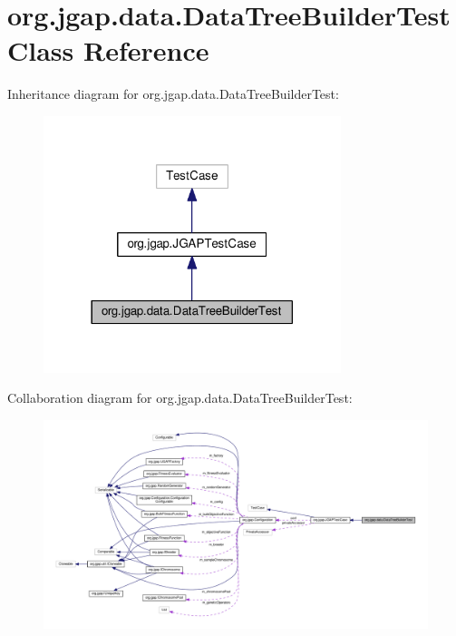 \hypertarget{classorg_1_1jgap_1_1data_1_1_data_tree_builder_test}{\section{org.\-jgap.\-data.\-Data\-Tree\-Builder\-Test Class Reference}
\label{classorg_1_1jgap_1_1data_1_1_data_tree_builder_test}
}


Inheritance diagram for org.\-jgap.\-data.\-Data\-Tree\-Builder\-Test\-:
\nopagebreak
\begin{figure}[H]
\begin{center}
\leavevmode
\includegraphics[width=246pt]{classorg_1_1jgap_1_1data_1_1_data_tree_builder_test__inherit__graph}
\end{center}
\end{figure}


Collaboration diagram for org.\-jgap.\-data.\-Data\-Tree\-Builder\-Test\-:
\nopagebreak
\begin{figure}[H]
\begin{center}
\leavevmode
\includegraphics[width=350pt]{classorg_1_1jgap_1_1data_1_1_data_tree_builder_test__coll__graph}
\end{center}
\end{figure}
